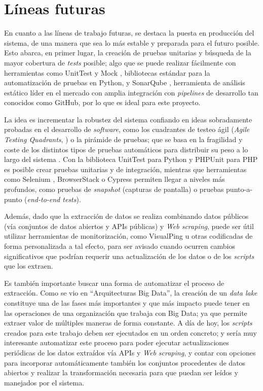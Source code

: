 \section{Líneas futuras}

En cuanto a las líneas de trabajo futuras, se destaca la puesta en producción del sistema, de una manera que sea lo más estable y preparada para el futuro posible. Esto abarca, en primer lugar, la creación de pruebas unitarias y búsqueda de la mayor cobertura de \textit{tests} posible; algo que se puede realizar fácilmente con herramientas como UnitTest \cite{unittest} y Mock \cite{mock}, bibliotecas estándar para la automatización de pruebas en Python, y SonarQube \cite{sonar}, herramienta de análisis estático líder en el mercado con amplia integración con \textit{pipelines} de desarrollo tan conocidos como GitHub, por lo que es ideal para este proyecto.

La idea es incrementar la robustez del sistema confiando en ideas sobradamente probadas en el desarrollo de \textit{software}, como los cuadrantes de testeo ágil (\textit{Agile Testing Quadrants}, \cite{agile_testing_quadrants}) o la pirámide de pruebas; que se basa en la fragilidad y coste de los distintos tipos de pruebas automáticos para distribuir su peso a lo largo del sistema \cite{testing_pyramid}. Con la biblioteca UnitTest para Python y PHPUnit para PHP \cite{PHPUnit} es posible crear pruebas unitarias y de integración, mientras que herramientas como Selenium \cite{selenium}, BrowserStack \cite{browserstack} o Cypress \cite{cypress} permiten llegar a niveles más profundos, como pruebas de \textit{snapshot} (capturas de pantalla) o pruebas punto-a-punto (\textit{end-to-end tests}).

Además, dado que la extracción de datos se realiza combinando datos públicos (vía conjuntos de datos abiertos y APIs públicas) y \textit{Web scraping}, puede ser útil utilizar herramientas de monitorización, como VisualPing \cite{visualping} u otras codificadas de forma personalizada a tal efecto, para ser avisado cuando ocurren cambios significativos que podrían requerir una actualización de los datos o de los \textit{scripts} que los extraen.

Es también importante buscar una forma de automatizar el proceso de extracción. Como se vio en ``Arquitecturas Big Data'', la creación de un \textit{data lake} constituye una de las fases más importantes y que más impacto puede tener en las operaciones de una organización que trabaja con Big Data; ya que permite extraer valor de múltiples maneras de forma constante. A día de hoy, los \textit{scripts} creados para este trabajo deben ser ejecutados en un orden concreto; y sería muy interesante automatizar este proceso para poder ejecutar actualizaciones periódicas de los datos extraídos vía APIs y \textit{Web scraping}, y contar con opciones para incorporar automáticamente también los conjuntos procedentes de datos abiertos y realizar la transformación necesaria para que puedan ser leídos y manejados por el sistema.

